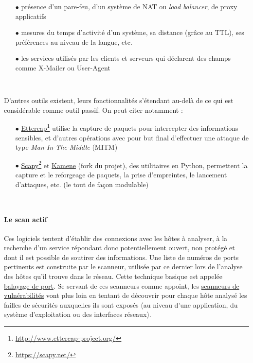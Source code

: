 \documentclass[]{article}
\begin{document}
\begin{itemize}
\vspace{0.2cm}
\item[$\bullet$] présence d'un pare-feu, d'un système de NAT ou \textit{load balancer}, de proxy applicatifs
\vspace{0.2cm}
\item[$\bullet$] mesures du temps d'activité d'un système, sa distance (grâce au TTL), ses préférences au niveau de la langue, etc.
\vspace{0.2cm}
\item[$\bullet$] les services utilisés par les clients et serveurs qui déclarent des champs comme X-Mailer ou User-Agent
\end{itemize}
~
\par D'autres outils existent, leurs fonctionnalités s'étendant au-delà de ce qui est considérable comme outil passif. On peut citer notamment :
\begin{itemize}
\vspace{0.2cm}
\item[$\bullet$] \href{http://www.ettercap-project.org/}{Ettercap}\footnote{\url{http://www.ettercap-project.org/}} utilise la capture de paquets pour intercepter des informations sensibles, et d'autres opérations avec pour but final d'effectuer une attaque de type \textit{Man-In-The-Middle} (MITM)
\vspace{0.2cm}
\item[$\bullet$] \href{https://scapy.net/}{Scapy}\footnote{\url{https://scapy.net/}} et \href{https://github.com/phaethon/kamene}{Kamene} (fork du projet), des utilitaires en Python, permettent la capture et le reforgeage de paquets, la prise d'empreintes, le lancement d'attaques, etc. (le tout de façon modulable)
\end{itemize}
~\\

\newpage

\paragraph{Le scan actif}

\par Ces logiciels tentent d'établir des connexions avec les hôtes à analyser, à la recherche d'un service répondant donc potentiellement ouvert, non protégé et dont il est possible de soutirer des informations. Une liste de numéros de ports pertinents est construite par le scanneur, utilisée par ce dernier lors de l'analyse des hôtes qu'il trouve dans le réseau. Cette technique basique est appelée \href{https://fr.wikipedia.org/wiki/Balayage_de_ports}{balayage de port}.   Se servant de ces scanneurs comme appoint, les \href{https://fr.wikipedia.org/wiki/Scanneur_de_vuln\%C3\%A9rabilit\%C3\%A9}{scanneurs de vulnérabilités} vont plus loin en tentant de découvrir pour chaque hôte analysé les failles de sécurités auxquelles ils sont exposés (au niveau d'une application, du système d'exploitation ou des interfaces réseaux).\\
\end{document}
